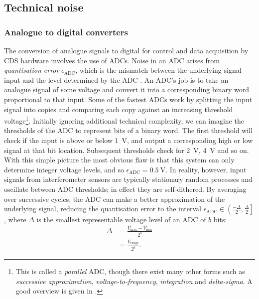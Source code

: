 \subsection{Technical noise}

\subsubsection{\label{sec:adcs-and-dacs}Analogue to digital converters}
The conversion of analogue signals to digital for control and data acquisition by \gls{CDS} hardware involves the use of \glspl{ADC}. Noise in an \gls{ADC} arises from \emph{quantisation error} $\epsilon_{\text{ADC}}$, which is the mismatch between the underlying signal input and the level determined by the \gls{ADC} \cite{Allen1997}. An \gls{ADC}'s job is to take an analogue signal of some voltage and convert it into a corresponding binary word proportional to that input. Some of the fastest \glspl{ADC} work by splitting the input signal into copies and comparing each copy against an increasing threshold voltage\footnote{This is called a \emph{parallel} \gls{ADC}, though there exist many other forms such as \emph{successive approximation}, \emph{voltage-to-frequency}, \emph{integration} and \emph{delta-sigma}. A good overview is given in \cite{Horowitz2015}.}. Initially ignoring additional technical complexity, we can imagine the thresholds of the \gls{ADC} to represent bits of a binary word. The first threshold will check if the input is above or below \SI{1}{\volt}, and output a corresponding high or low signal at that bit location. Subsequent thresholds check for \SI{2}{\volt}, \SI{4}{\volt} and so on. With this simple picture the most obvious flaw is that this system can only determine integer voltage levels, and so $\epsilon_{\text{ADC}} = \SI{0.5}{\volt}$. In reality, however, input signals from interferometer sensors are typically stationary random processes and oscillate between \gls{ADC} thresholds; in effect they are self-dithered. By averaging over successive cycles, the \gls{ADC} can make a better approximation of the underlying signal, reducing the quantisation error to the interval $\epsilon_{\text{ADC}} \in \left( \frac{-\Delta}{2}, \frac{\Delta}{2} \right]$ \cite{Allen1997}, where $\Delta$ is the smallest representable voltage level of an \gls{ADC} of $b$ bits:
\begin{equation}
  \begin{split}
    \Delta &= \frac{V_{\text{max}} - V_{\text{min}}}{2^{b}} \\
           &= \frac{V_{\text{range}}}{2^{b}}.
  \end{split}
\end{equation}

